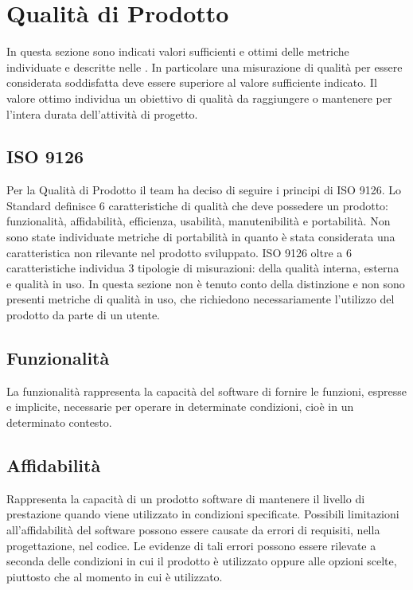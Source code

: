\section{Qualità di Prodotto}
In questa sezione sono indicati valori sufficienti e ottimi delle metriche individuate e descritte nelle \NdP .
In particolare una misurazione di qualità per essere considerata soddisfatta deve essere superiore al valore sufficiente indicato. 
Il valore ottimo individua un obiettivo di qualità da raggiungere o mantenere per l'intera durata dell'attività di progetto.
\subsection{ISO 9126}
Per la Qualità di Prodotto il team ha deciso di seguire i principi di ISO 9126.
Lo Standard definisce 6 caratteristiche di qualità che deve possedere un prodotto: funzionalità, affidabilità, efficienza, usabilità, manutenibilità e portabilità. 
Non sono state individuate metriche di portabilità in quanto è stata considerata una caratteristica non rilevante nel prodotto sviluppato. 
ISO 9126 oltre a 6 caratteristiche individua 3 tipologie di misurazioni: della qualità interna, esterna e qualità in uso. 
In questa sezione non è tenuto conto della distinzione e non sono presenti metriche di qualità in uso, che richiedono necessariamente l'utilizzo del prodotto da parte di un utente.

\subsection{Funzionalità}
La funzionalità rappresenta la capacità del software di fornire le funzioni, espresse e implicite, necessarie per operare in determinate condizioni, cioè in un determinato contesto.
\def\productquality{
    {
        Correttezza dello scambio dei dati,
        $D_{err} = \#\ di\ errori$, 
        $D_{err} < 10\%$,
        $D_{err} = 0$
    },
}


\subsection{Affidabilità}
Rappresenta la capacità di un prodotto software di mantenere il livello di prestazione quando viene utilizzato in condizioni specificate. Possibili limitazioni all'affidabilità del software possono essere causate da errori di requisiti, nella progettazione, nel codice. Le evidenze di tali errori possono essere rilevate a seconda delle condizioni in cui il prodotto è utilizzato oppure alle opzioni scelte, piuttosto che al momento in cui è utilizzato.
\def\productquality{
    {
        Densità di errori,
        $E_{density} = A_{err}/B_{tests}$, 
        $E_{density} < 5\% $,
        $E_{density} = 0$
    },
}


